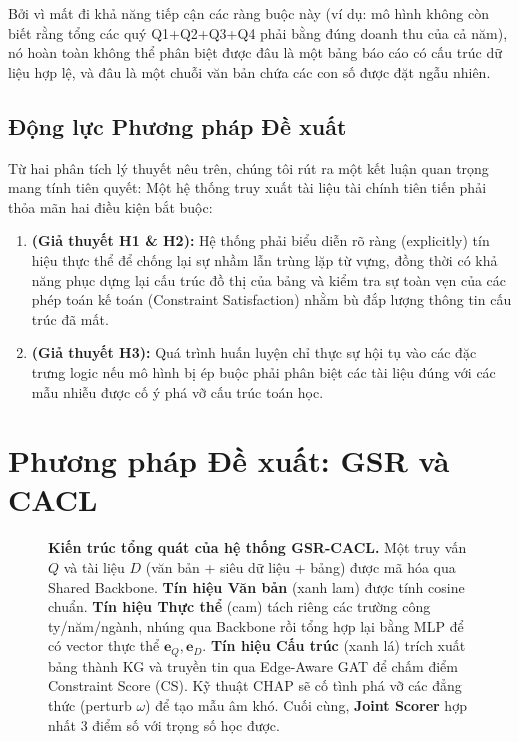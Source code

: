 \documentclass[10pt, a4paper]{article}
\begin{document}
Bởi vì mất đi khả năng tiếp cận các ràng buộc này (ví dụ: mô hình không còn biết rằng tổng các quý Q1+Q2+Q3+Q4 phải bằng đúng doanh thu của cả năm), nó hoàn toàn không thể phân biệt được đâu là một bảng báo cáo có cấu trúc dữ liệu hợp lệ, và đâu là một chuỗi văn bản chứa các con số được đặt ngẫu nhiên.

\subsection{Động lực Phương pháp Đề xuất}
Từ hai phân tích lý thuyết nêu trên, chúng tôi rút ra một kết luận quan trọng mang tính tiên quyết: Một hệ thống truy xuất tài liệu tài chính tiên tiến phải thỏa mãn hai điều kiện bắt buộc:
\begin{enumerate}
    \item \textbf{(Giả thuyết H1 \& H2):} Hệ thống phải biểu diễn rõ ràng (explicitly) tín hiệu thực thể để chống lại sự nhầm lẫn trùng lặp từ vựng, đồng thời có khả năng phục dựng lại cấu trúc đồ thị của bảng và kiểm tra sự toàn vẹn của các phép toán kế toán (Constraint Satisfaction) nhằm bù đắp lượng thông tin cấu trúc đã mất.
    \item \textbf{(Giả thuyết H3):} Quá trình huấn luyện chỉ thực sự hội tụ vào các đặc trưng logic nếu mô hình bị ép buộc phải phân biệt các tài liệu đúng với các mẫu nhiễu được cố ý phá vỡ cấu trúc toán học.
\end{enumerate}

\section{Phương pháp Đề xuất: GSR và CACL}

\begin{figure}[H]
    \centering
    
    \caption{\textbf{Kiến trúc tổng quát của hệ thống GSR-CACL.} Một truy vấn $Q$ và tài liệu $D$ (văn bản + siêu dữ liệu + bảng) được mã hóa qua Shared Backbone. \textbf{Tín hiệu Văn bản} (xanh lam) được tính cosine chuẩn. \textbf{Tín hiệu Thực thể} (cam) tách riêng các trường công ty/năm/ngành, nhúng qua Backbone rồi tổng hợp lại bằng MLP để có vector thực thể $\mathbf{e}_Q, \mathbf{e}_D$. \textbf{Tín hiệu Cấu trúc} (xanh lá) trích xuất bảng thành KG và truyền tin qua Edge-Aware GAT để chấm điểm Constraint Score (CS). Kỹ thuật CHAP sẽ cố tình phá vỡ các đẳng thức (perturb $\omega$) để tạo mẫu âm khó. Cuối cùng, \textbf{Joint Scorer} hợp nhất 3 điểm số với trọng số học được.}
    \label{fig:framework}
\end{figure}
\end{document}
